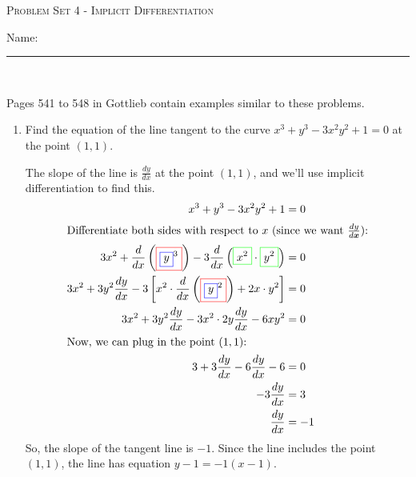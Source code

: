 \documentclass{article}
\begin{document}
\begin{center}
  \large\textsc{Problem Set 4 - Implicit Differentiation}

    \pspace{12pt}
  \begin{problemonly}\large Name: \rule{5cm}{0.15mm}\\ \end{problemonly}
\end{center}

  Pages 541 to 548 in Gottlieb contain examples similar to these problems.

  \begin{enumerate}
  \item
\begin{problem}[\vfill]
      Find the equation of the line tangent to the curve
      $x^3+y^3-3x^2 y^2 +1=0$ at the point $(1,1)$.
    \end{problem}

    \begin{solution} 
      The slope of the line is $\frac{dy}{dx}$ at the point $(1, 1)$, and
      we'll use implicit differentiation to find this.
      \begin{align*}
        x^3+y^3-3x^2 y^2 +1&=0\\
        \intertext{Differentiate both sides with respect to $x$ (since we
          want $\frac{dy}{d\bm{x}}$):}
        3 x^ { 2} + \frac{d}{dx}
        \left(\fcolorbox{red}{white}{$\displaystyle
            \fcolorbox{blue}{white}{$\displaystyle  y$}^ {
              3} $}\right)- 3 \frac{d}{dx}
        \left(\fcolorbox{green}{white}{$\displaystyle  x^ { 2} $}\cdot
          \fcolorbox{green}{white}{$\displaystyle  y^ { 2} $}\right) &= 0 \\
        3 x^ { 2} + 3 y^ { 2} \frac{dy}{dx}- 3 \left[x^ { 2} \cdot
          \frac{d}{dx} \left(\fcolorbox{red}{white}{$\displaystyle
              \fcolorbox{blue}{white}{$\displaystyle  y$}^ { 2} $}\right)+
          2 x\cdot y^ { 2} \right] &= 0 \\
        3x^2+3y^2\frac{dy}{dx} - 3x^2\cdot2y\frac{dy}{dx} - 6xy^2 & = 0\\
        \intertext{Now, we can plug in the point $(1, 1)$:}
        3 + 3 \frac{dy}{dx} - 6 \frac{dy}{dx} - 6 &= 0 \\
        -3 \frac{dy}{dx} &= 3 \\
        \frac{dy}{dx} &= -1
      \end{align*}
      So, the slope of the tangent line is $-1$.  Since the line includes
      the point $(1, 1)$, the line has equation $\boxed{y-1 = -1(x-1)}$.
    \end{solution}


\end{enumerate}
\end{document}
